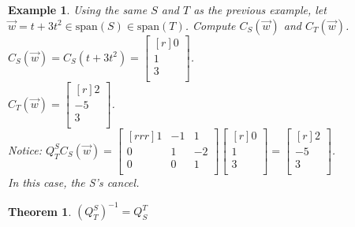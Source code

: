 \documentclass{report}
\newtheorem*{ex}{Example}
\newtheorem*{thrm}{Theorem}
\begin{document}
\begin{ex}
Using the same $S$ and $T$ as the previous example, let $\vec{w} = t+3t^2\in \mathrm{span}(S) \in \mathrm{span}(T)$. Compute $C_S(\vec{w})$ and $C_T(\vec{w})$.
$C_S(\vec{w}) = C_S(t+3t^2) = \begin{bmatrix}[r]0\\1\\3\\\end{bmatrix}$.\\
$C_T(\vec{w})=\begin{bmatrix}[r]2\\-5\\3\\\end{bmatrix}$.\\
Notice: $Q_T^SC_S(\vec{w}) = \begin{bmatrix}[rrr]1&-1&1\\0&1&-2\\0&0&1\\\end{bmatrix}\begin{bmatrix}[r]0\\1\\3\\\end{bmatrix} = \begin{bmatrix}[r]2\\-5\\3\\\end{bmatrix}$.\\
In this case, the S's cancel.
\end{ex}
\begin{thrm}
$(Q_T^S)^{-1} = Q_S^T$
\end{thrm}
\end{document}
